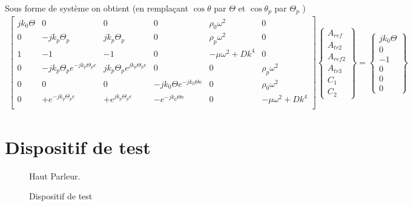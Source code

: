 \documentclass[12pt,foolscap]{report}
\begin{document}
	Sous forme de système on obtient (en remplaçant $\cos \theta$ par $\Theta$ et $\cos \theta_p$ par $\Theta_p$ )
	\begin{align}	
	\begin{bmatrix}
	j k_0 \Theta    &0 & 0 &0&\rho_0\omega^2&0  \\
	0       & -j k_p \Theta_p & j k_p \Theta_p & 0 &\rho_p\omega^2 & 0  \\
	1       & -1 & -1 & 0 &-\mu \omega^2+Dk^4 & 0  \\
	0    &-j k_p \Theta_p e^{-jk_p\Theta_p e}   & j k_p \Theta_p e^{jk_p\Theta_p e}   &0&0&\rho_p\omega^2  \\
	0       & 0 & 0 &- j k_0 \Theta e^{-jk_0\Theta e} &0 & \rho_0\omega^2   \\
	0     & + e^{-jk_p\Theta_p e} & +e^{jk_p\Theta_p e} & - 	e^{-jk_0\Theta e} &0 & -\mu \omega^2+Dk^4  \\
	\end{bmatrix}
	\begin{Bmatrix}
	A_{ref} \\
	A_{tr2} \\
	A_{ref2}\\
	A_{tr3}\\
	C_{1} \\
	C_{2} 
	\end{Bmatrix}
	=\begin{Bmatrix}
	j k_0 \Theta \\
	0 \\
	-1\\
	0\\
	0 \\
	0
	\end{Bmatrix}
	\end{align}
	
	\chapter{ Dispositif de test}
	\begin{figure}[h]
		\begin{minipage}[c]{.45\linewidth}
			\begin{center}
				\caption{Haut Parleur.}
				\label{HautParleur}
			\end{center}
		\end{minipage}
		\hfill
		\begin{minipage}[c]{.45\linewidth}
			\begin{center}
				\caption{Dispositif de test}
				\label{Microsetautres}
			\end{center}
		\end{minipage}
	\end{figure}
	
	
\end{document}
